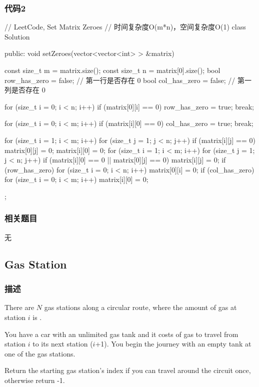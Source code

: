\subsubsection{代码2}
\begin{Code}
	// LeetCode, Set Matrix Zeroes
	// 时间复杂度O(m*n)，空间复杂度O(1)
	class Solution {
		public:
		void setZeroes(vector<vector<int> > &matrix) {
			const size_t m = matrix.size();
			const size_t n = matrix[0].size();
			bool row_has_zero = false; // 第一行是否存在 0
			bool col_has_zero = false; // 第一列是否存在 0
			
			for (size_t i = 0; i < n; i++)
			if (matrix[0][i] == 0) {
				row_has_zero = true;
				break;
			}
			
			for (size_t i = 0; i < m; i++)
			if (matrix[i][0] == 0) {
				col_has_zero = true;
				break;
			}
			
			for (size_t i = 1; i < m; i++)
			for (size_t j = 1; j < n; j++)
			if (matrix[i][j] == 0) {
				matrix[0][j] = 0;
				matrix[i][0] = 0;
			}
			for (size_t i = 1; i < m; i++)
			for (size_t j = 1; j < n; j++)
			if (matrix[i][0] == 0 || matrix[0][j] == 0)
			matrix[i][j] = 0;
			if (row_has_zero)
			for (size_t i = 0; i < n; i++)
			matrix[0][i] = 0;
			if (col_has_zero)
			for (size_t i = 0; i < m; i++)
			matrix[i][0] = 0;
		}
	};
\end{Code}


\subsubsection{相关题目}
\begindot
\item 无
\myenddot


\subsection{Gas Station} %
\label{sec:gas-station}


\subsubsection{描述}
There are $N$ gas stations along a circular route, where the amount of gas at 
station $i$ is .

You have a car with an unlimited gas tank and it costs  of gas to 
travel from station $i$ to its next station ($i$+1). You begin the journey with 
an empty tank at one of the gas stations.

Return the starting gas station's index if you can travel around the circuit 
once, otherwise return -1.

